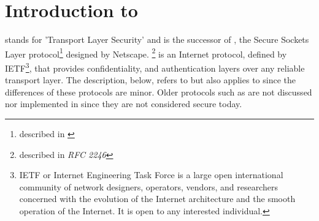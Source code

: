 \chapter{Introduction to \tls{}}

\label{sec:tlsintro}
\tls{} stands for 'Transport Layer Security' and is the successor of \ssl{},
the Secure Sockets Layer protocol\footnote{described in \cite{SSL3}} designed by Netscape. 
\tlsI{}\footnote{described in {\it RFC 2246}\cite{RFC2246}} is an Internet protocol,
defined by {IETF}\footnote{IETF or Internet Engineering Task Force 
is a large open international community of network
designers, operators, vendors, and researchers concerned with the evolution of 
the Internet architecture and the smooth operation of the Internet. It is open 
to any interested individual.}, 
that provides confidentiality, and authentication layers over any reliable
transport layer. The description, below, refers to \tlsI{} but also
applies to \sslIII{} since the differences of these protocols are minor.
Older protocols such as \sslII{} are not discussed nor implemented in \gnutls{} 
since they are not considered secure today.












